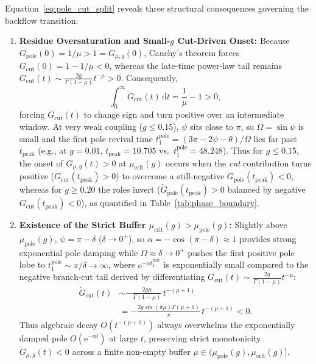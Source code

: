 \documentclass[twocolumn,10pt,amsmath,amssymb,floatfix]{revtex4-2}
\theoremstyle{plain}
\theoremstyle{definition}
\newcommand{\dd}{\mathrm{d}}
\newcommand{\ee}{\mathrm{e}}
\newcommand{\mupole}{\mu_{\mathrm{pole}}}
\newcommand{\mucrit}{\mu_{\mathrm{crit}}}
\begin{document}
Equation~\eqref{eq:pole_cut_split} reveals three structural consequences governing the backflow transition:
\begin{enumerate}[leftmargin=1.4em,itemsep=2pt]
\item \textbf{Residue Oversaturation and Small-$g$ Cut-Driven Onset:} Because $G_{\mathrm{pole}}(0) = 1/\mu > 1 = G_{\mu,g}(0)$, Cauchy's theorem forces $G_{\mathrm{cut}}(0) = 1 - 1/\mu < 0$, whereas the late-time power-law tail remains $G_{\mathrm{cut}}(t) \sim \frac{2g}{\Gamma(1-\mu)} t^{-\mu} > 0$. Consequently,
\[
\int_0^\infty \dot{G}_{\mathrm{cut}}(t)\,\dd t = \frac{1}{\mu} - 1 > 0,
\]
forcing $\dot{G}_{\mathrm{cut}}(t)$ to change sign and turn positive over an intermediate window. At very weak coupling ($g \le 0.15$), $\psi$ sits close to $\pi$, so $\Omega = \sin\psi$ is small and the first pole revival time $t_1^{\mathrm{pole}} = (3\pi - 2\psi - \theta)/\Omega$ lies far past $t_{\mathrm{peak}}$ (e.g., at $g=0.01$, $t_{\mathrm{peak}}=10.705$ vs.\ $t_1^{\mathrm{pole}}=48.248$). Thus for $g \le 0.15$, the onset of $\dot{G}_{\mu,g}(t) > 0$ at $\mucrit(g)$ occurs when the \emph{cut} contribution turns positive ($\dot{G}_{\mathrm{cut}}(t_{\mathrm{peak}}) > 0$) to overcome a still-negative $\dot{G}_{\mathrm{pole}}(t_{\mathrm{peak}}) < 0$, whereas for $g \ge 0.20$ the roles invert ($\dot{G}_{\mathrm{pole}}(t_{\mathrm{peak}}) > 0$ balanced by negative $\dot{G}_{\mathrm{cut}}(t_{\mathrm{peak}}) < 0$), as quantified in Table~\ref{tab:phase_boundary}.
\item \textbf{Existence of the Strict Buffer $\mucrit(g) > \mupole(g)$:} Slightly above $\mupole(g)$, $\psi = \pi - \delta$ ($\delta \to 0^+$), so $\alpha = -\cos(\pi-\delta) \approx 1$ provides strong exponential pole damping while $\Omega \approx \delta \to 0^+$ pushes the first positive pole lobe to $t_1^{\mathrm{pole}} \sim \pi/\delta \to \infty$, where $\ee^{-\alpha t_1^{\mathrm{pole}}}$ is exponentially small compared to the negative branch-cut tail derived by differentiating $G_{\mathrm{cut}}(t) \sim \frac{2g}{\Gamma(1-\mu)} t^{-\mu}$:
\begin{align}
\label{eq:dG_cut_tail}
\dot{G}_{\mathrm{cut}}(t) &\sim -\frac{2g\mu}{\Gamma(1-\mu)}\,t^{-(\mu+1)} \nonumber\\
&= -\frac{2g\sin(\pi\mu)\Gamma(\mu+1)}{\pi}\,t^{-(\mu+1)} < 0.
\end{align}
Thus algebraic decay $O(t^{-(\mu+1)})$ always overwhelms the exponentially damped pole $O(\ee^{-\alpha t})$ at large $t$, preserving strict monotonicity $\dot{G}_{\mu,g}(t) < 0$ across a finite non-empty buffer $\mu \in (\mupole(g), \mucrit(g)]$.

\end{enumerate}
\end{document}
